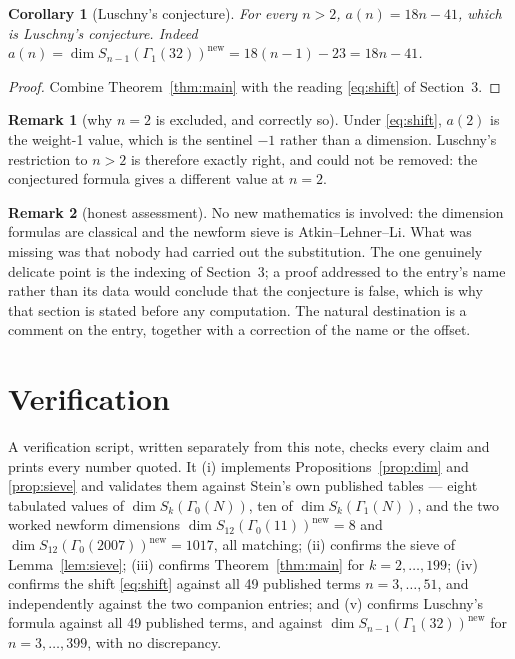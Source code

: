 \documentclass[11pt,a4paper]{article}
\theoremstyle{plain}
\newtheorem{corollary}[theorem]{Corollary}
\theoremstyle{definition}
\newtheorem*{remark}{Remark}
\begin{document}
\begin{corollary}[Luschny's conjecture]\label{cor:main}
For every $n>2$, $a(n)=18n-41$, which is Luschny's conjecture. Indeed
$a(n)=\dim S_{n-1}(\Gamma_{1}(32))^{\mathrm{new}}=18(n-1)-23=18n-41$.
\end{corollary}

\begin{proof}
Combine Theorem~\ref{thm:main} with the reading \eqref{eq:shift} of Section~3.
\end{proof}

\begin{remark}[why $n=2$ is excluded, and correctly so]
Under \eqref{eq:shift}, $a(2)$ is the weight-1 value, which is the sentinel $-1$ rather
than a dimension. Luschny's restriction to $n>2$ is therefore exactly right, and could not
be removed: the conjectured formula gives a different value at $n=2$.
\end{remark}

\begin{remark}[honest assessment]
No new mathematics is involved: the dimension formulas are classical and the newform sieve
is Atkin--Lehner--Li. What was missing was that nobody had carried out the substitution.
The one genuinely delicate point is the indexing of Section~3; a proof addressed to the
entry's name rather than its data would conclude that the conjecture is false, which is why
that section is stated before any computation. The natural destination is a comment on the
entry, together with a correction of the name or the offset.
\end{remark}

\section{Verification}

A verification script, written separately from this note, checks every claim and prints
every number quoted. It (i) implements Propositions~\ref{prop:dim} and \ref{prop:sieve} and
validates them against Stein's own published tables --- eight tabulated values of
$\dim S_{k}(\Gamma_{0}(N))$, ten of $\dim S_{k}(\Gamma_{1}(N))$, and the two worked newform
dimensions $\dim S_{12}(\Gamma_{0}(11))^{\mathrm{new}}=8$ and
$\dim S_{12}(\Gamma_{0}(2007))^{\mathrm{new}}=1017$, all matching; (ii) confirms the sieve
of Lemma~\ref{lem:sieve}; (iii) confirms Theorem~\ref{thm:main} for $k=2,\dots,199$;
(iv) confirms the shift \eqref{eq:shift} against all 49 published terms
$n=3,\dots,51$, and independently against the two companion entries; and (v) confirms
Luschny's formula against all 49 published terms, and against
$\dim S_{n-1}(\Gamma_{1}(32))^{\mathrm{new}}$ for $n=3,\dots,399$, with no discrepancy.
\end{document}
